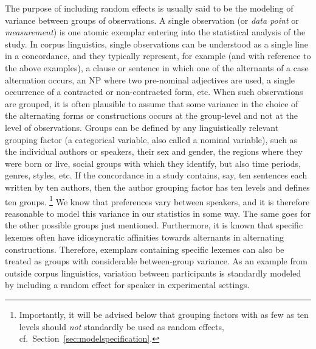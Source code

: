 \documentclass[a4paper,12pt]{article}
\begin{document}
The purpose of including random effects is usually said to be the modeling of variance between groups of observations.
A single observation (or \textit{data point} or \textit{measurement}) is one atomic exemplar entering into the statistical analysis of the study.
In corpus linguistics, single observations can be understood as a single line in a concordance, and they typically represent, for example (and with reference to the above examples), a clause or sentence in which one of the alternants of a case alternation occurs, an NP where two pre-nominal adjectives are used, a single occurrence of a contracted or non-contracted form, etc.
When such observations are grouped, it is often plausible to assume that some variance in the choice of the alternating forms or constructions occurs at the group-level and not at the level of observations.
Groups can be defined by any linguistically relevant grouping factor (a categorical variable, also called a nominal variable), such as the individual authors or speakers, their sex and gender, the regions where they were born or live, social groups with which they identify, but also time periods, genres, styles, etc.
If the concordance in a study contains, say, ten sentences each written by ten authors, then the author grouping factor has ten levels and defines ten groups.%
\footnote{Importantly, it will be advised below that grouping factors with as few as ten levels should \textit{not} standardly be used as random effects, cf.\ Section~\ref{sec:modelspecification}.}
We know that preferences vary between speakers, and it is therefore reasonable to model this variance in our statistics in some way.
The same goes for the other possible groups just mentioned.
Furthermore, it is known that specific lexemes often have idiosyncratic affinities towards alternants in alternating constructions.
Therefore, exemplars containing specific lexemes can also be treated as groups with considerable between-group variance.
As an example from outside corpus linguistics, variation between participants is standardly modeled by including a random effect for speaker in experimental settings.
\end{document}
